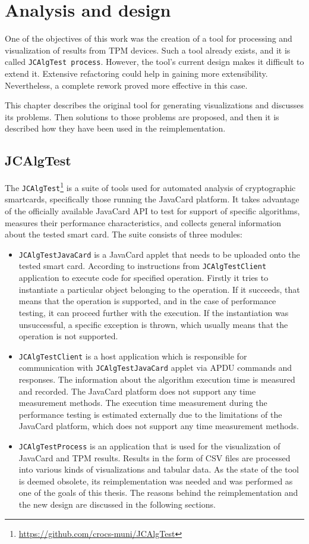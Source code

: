 \chapter{Analysis and design}
One of the objectives of this work was the creation of a tool for processing and visualization of results from TPM devices. Such a tool already exists, and it is called \texttt{JCAlgTest process}. However, the tool's current design makes it difficult to extend it. Extensive refactoring could help in gaining more extensibility. Nevertheless, a complete rework proved more effective in this case.

This chapter describes the original tool for generating visualizations and discusses its problems. Then solutions to those problems are proposed, and then it is described how they have been used in the reimplementation.

\section{JCAlgTest}\label{sec:jcalgtest}
The \texttt{JCAlgTest}\footnote{\url{https://github.com/crocs-muni/JCAlgTest}} is a suite of tools used for automated analysis of cryptographic smartcards, specifically those running the JavaCard platform. It takes advantage of the officially available JavaCard API to test for support of specific algorithms, measures their performance characteristics, and collects general information about the tested smart card. The suite consists of three modules:
\begin{itemize}
  \item
        \texttt{JCAlgTestJavaCard} is a JavaCard applet that needs to be uploaded onto the tested smart card. According to instructions from \texttt{JCAlgTestClient} application to execute code for specified operation. Firstly it tries to instantiate a particular object belonging to the operation. If it succeeds, that means that the operation is supported, and in the case of performance testing, it can proceed further with the execution. If the instantiation was unsuccessful, a specific exception is thrown, which usually means that the operation is not supported.
  \item
        \texttt{JCAlgTestClient} is a host application which is responsible for communication with \texttt{JCAlgTestJavaCard} applet via APDU commands and responses. The information about the algorithm execution time is measured and recorded. The JavaCard platform does not support any time measurement methods. The execution time measurement during the performance testing is estimated externally due to the limitations of the JavaCard platform, which does not support any time measurement methods.
  \item
        \texttt{JCAlgTestProcess} is an application that is used for the visualization of JavaCard and TPM results. Results in the form of CSV files are processed into various kinds of visualizations and tabular data. As the state of the tool is deemed obsolete, its reimplementation was needed and was performed as one of the goals of this thesis. The reasons behind the reimplementation and the new design are discussed in the following sections.
\end{itemize}

